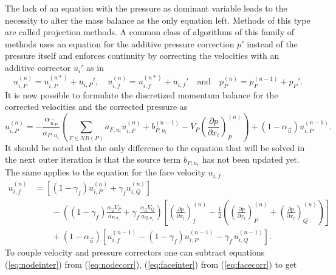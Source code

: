  The lack of an equation with the pressure as dominant variable leads to the necessity to alter the mass balance as the only equation left. Methods of this type are called projection methods. A common class of algorithms of this family of methods uses an equation for the additive pressure correction \(p'\) instead of the pressure itself and enforces continuity by correcting the velocities with an additive corrector \(u_i'\) as in
  \begin{displaymath}
    u_{i,P}^{(n)} =  u_{i,P}^{(n*)}  + u_{i,P}',\quad u_{i,f}^{(n)} =  u_{i,f}^{(n*)}  + u_{i,f}' \quad \text{and} \quad   p_P^{(n)} =  p_P^{(n-1)}  + p_P'.
  \end{displaymath}
  It is now possible to formulate the discretized momentum balance for the corrected velocities and the corrected pressure as
  \begin{equation}
    \label{eq:nodecorr}
    u_{i,P}^{(n)} 
    = 
    - \frac{\alpha_{\vec{u}_P}}{a_{P,u_i}} \left(\sum_{F \in NB(P)} a_{F,u_i} u_{i,F}^{(n)}
    +                                     b_{P,u_i}^{(n-1)} 
    -                                     V_P\left(\frac{\partial p}{\partial x_i}\right)_P^{(n)} \right)
    + \left(1 - \alpha_{\vec{u}}\right) u_{i,P}^{(n-1)}  .
  \end{equation}
  It should be noted that the only difference to the equation that will be solved in the next outer iteration is that the source term \(b_{P,u_i}\) has not been updated yet. The same applies to the equation for the face velocity \(u_{i,f}\)
  \begin{align}
    \label{eq:facecorr}
    u_{i,f}^{(n)} 
    &=
    \left[\left(1 - \gamma_f\right) u_{i,P}^{(n)} + \gamma_f u_{i,Q}^{(n)} \right] \nonumber\\[1em]
    &\quad\quad - 
    \left(\left(1 - \gamma_f\right) \frac{\alpha_\vec{u} V_P}{a_{P,u_i}} + \gamma_f \frac{\alpha_\vec{u} V_Q}{a_{Q,u_i}}\right)
    \left[ 
    \left(\frac{\partial p}{\partial x_i}\right)_f^{(n)} 
    - \frac{1}{2} \left( \left( \frac{\partial p}{\partial x_i} \right)_P^{(n)} 
    + \left(\frac{\partial p}{\partial x_i}\right)_Q^{(n)} \right)
    \right] \nonumber \\[1em]
    &\quad\quad + \left(1 - \alpha_\vec{u}\right) \left[ u_{i,f}^{(n-1)} - \left(1 - \gamma_f\right) u_{i,P}^{(n-1)} - \gamma_f \, u_{i,Q}^{(n-1)} \right].
  \end{align}
  To couple velocity and pressure correctors one can subtract equations (\ref{eq:nodeinter}) from (\ref{eq:nodecorr}), (\ref{eq:faceinter}) from (\ref{eq:facecorr}) to get
